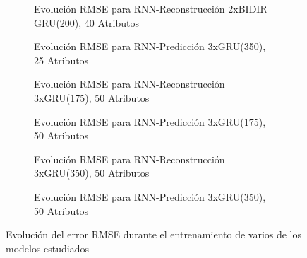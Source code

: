 \begin{figure}[h!t]
  \centering
  \begin{subfigure}[b]{0.48\textwidth}
      \centering
      \caption{\footnotesize \footnotesize \label{fig:rnnTrain:recon:bidir:40}Evolución RMSE para RNN-Reconstrucción 2xBIDIR GRU(200), 40 Atributos}
  \end{subfigure}
\hfill
  \begin{subfigure}[b]{0.48\textwidth}
      \centering
      \caption{\footnotesize \footnotesize \label{fig:rnnTrain:predict:25}Evolución RMSE para RNN-Predicción 3xGRU(350), 25 Atributos}
  \end{subfigure}
  

  \begin{subfigure}[b]{0.48\textwidth}
      \centering
      \caption{\footnotesize \footnotesize \label{fig:rnnTrain:recon:175}Evolución RMSE para RNN-Reconstrucción 3xGRU(175), 50 Atributos}
  \end{subfigure}
\hfill
  \begin{subfigure}[b]{0.48\textwidth}
      \centering
      \caption{\footnotesize \footnotesize \label{fig:rnnTrain:predict:175}Evolución RMSE para RNN-Predicción 3xGRU(175), 50 Atributos}
  \end{subfigure}


  \begin{subfigure}[b]{0.49\textwidth}
      \centering
      \caption{\footnotesize \footnotesize \label{fig:rnnTrain:recon:50}Evolución RMSE para RNN-Reconstrucción 3xGRU(350), 50 Atributos}
  \end{subfigure}
  \hfill
  \begin{subfigure}[b]{0.49\textwidth}
      \centering
      \caption{\footnotesize \footnotesize \label{fig:modelo:rnnTrain:predict:50}Evolución RMSE para RNN-Predicción 3xGRU(350), 50 Atributos}
  \end{subfigure}
  \caption{\label{fig:rnn:training} Evolución del error RMSE durante el entrenamiento de varios de los modelos estudiados}
\end{figure}

